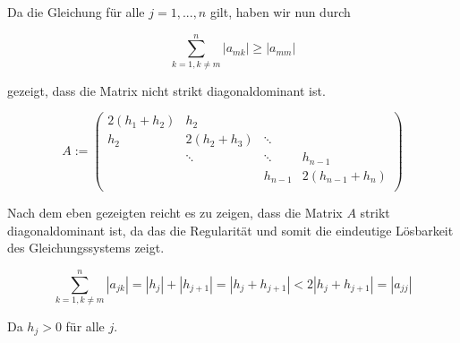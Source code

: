 \documentclass[]{article}
\begin{document}
Da die Gleichung für alle $j=1, ..., n$ gilt, haben wir nun durch

\[\sum_{k=1, k\neq m}^{n}|a_{mk}| \geq |a_{mm}|\]

gezeigt, dass die Matrix nicht strikt diagonaldominant ist.

\[
A :=
\begin{pmatrix}
	2(h_1+h_2) & h_2          &         &         \\
	h_2        & 2(h_2 + h_3) & \ddots  &         \\
	           & \ddots       & \ddots  & h_{n-1} \\
	           &              & h_{n-1} & 2(h_{n-1}+h_n)\\
\end{pmatrix}\]

Nach dem eben gezeigten reicht es zu zeigen, dass die Matrix $A$ strikt diagonaldominant ist, da das die Regularität und somit die eindeutige Lösbarkeit des Gleichungssystems zeigt.

\[\sum_{k=1, k\neq m}^{n}|a_{jk}| = |h_j| + |h_{j+1}| = |h_j + h_{j+1}| < 2|h_j + h_{j+1}| = |a_{jj}|\]

Da $h_j > 0$ für alle $j$.
\end{document}
